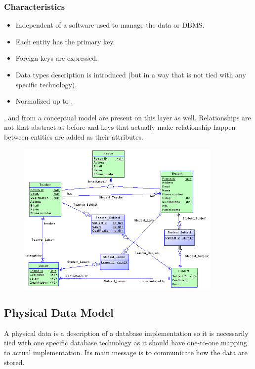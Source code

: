 \subsubsection{Characteristics}
\begin{itemize}
	\item Independent of a software used to manage the data or DBMS.
	\item Each entity has the primary key.
	\item Foreign keys are expressed.
	\item Data types description is introduced (but in a way that is not tied with any specific technology).
	\item Normalized up to .
\end{itemize}
,  and  from a conceptual model are present on this layer as well. Relationships are not that abstract as before and keys that actually make relationship happen between entities are added as their attributes.

\begin{figure}[H]
	\centering
	\includegraphics[width=10cm]{../img/Logical_Model_PowerDesigner}
	\caption{\cite{LogicalModelExample}}
\end{figure}

\subsection{Physical Data Model}

A physical data is a description of a database implementation so it is necessarily tied with one specific database technology as it should have one-to-one mapping to actual implementation. Its main message is to communicate how the data are stored.

